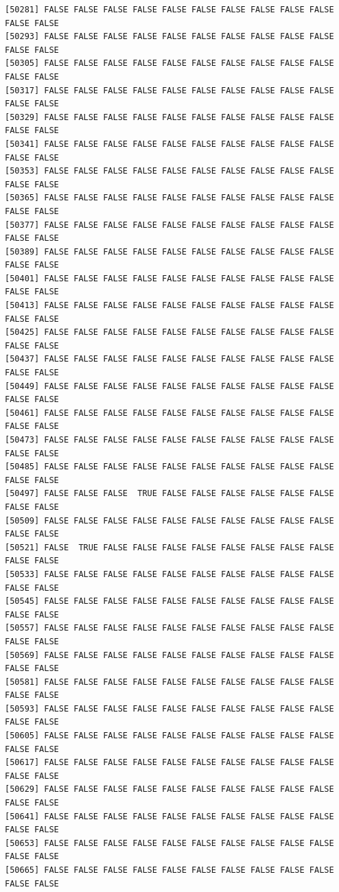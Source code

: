 \documentclass[
  a4paper,
  DIV=11,
  numbers=noendperiod]{scrartcl}
\begin{document}
\begin{verbatim}
[50281] FALSE FALSE FALSE FALSE FALSE FALSE FALSE FALSE FALSE FALSE FALSE FALSE
[50293] FALSE FALSE FALSE FALSE FALSE FALSE FALSE FALSE FALSE FALSE FALSE FALSE
[50305] FALSE FALSE FALSE FALSE FALSE FALSE FALSE FALSE FALSE FALSE FALSE FALSE
[50317] FALSE FALSE FALSE FALSE FALSE FALSE FALSE FALSE FALSE FALSE FALSE FALSE
[50329] FALSE FALSE FALSE FALSE FALSE FALSE FALSE FALSE FALSE FALSE FALSE FALSE
[50341] FALSE FALSE FALSE FALSE FALSE FALSE FALSE FALSE FALSE FALSE FALSE FALSE
[50353] FALSE FALSE FALSE FALSE FALSE FALSE FALSE FALSE FALSE FALSE FALSE FALSE
[50365] FALSE FALSE FALSE FALSE FALSE FALSE FALSE FALSE FALSE FALSE FALSE FALSE
[50377] FALSE FALSE FALSE FALSE FALSE FALSE FALSE FALSE FALSE FALSE FALSE FALSE
[50389] FALSE FALSE FALSE FALSE FALSE FALSE FALSE FALSE FALSE FALSE FALSE FALSE
[50401] FALSE FALSE FALSE FALSE FALSE FALSE FALSE FALSE FALSE FALSE FALSE FALSE
[50413] FALSE FALSE FALSE FALSE FALSE FALSE FALSE FALSE FALSE FALSE FALSE FALSE
[50425] FALSE FALSE FALSE FALSE FALSE FALSE FALSE FALSE FALSE FALSE FALSE FALSE
[50437] FALSE FALSE FALSE FALSE FALSE FALSE FALSE FALSE FALSE FALSE FALSE FALSE
[50449] FALSE FALSE FALSE FALSE FALSE FALSE FALSE FALSE FALSE FALSE FALSE FALSE
[50461] FALSE FALSE FALSE FALSE FALSE FALSE FALSE FALSE FALSE FALSE FALSE FALSE
[50473] FALSE FALSE FALSE FALSE FALSE FALSE FALSE FALSE FALSE FALSE FALSE FALSE
[50485] FALSE FALSE FALSE FALSE FALSE FALSE FALSE FALSE FALSE FALSE FALSE FALSE
[50497] FALSE FALSE FALSE  TRUE FALSE FALSE FALSE FALSE FALSE FALSE FALSE FALSE
[50509] FALSE FALSE FALSE FALSE FALSE FALSE FALSE FALSE FALSE FALSE FALSE FALSE
[50521] FALSE  TRUE FALSE FALSE FALSE FALSE FALSE FALSE FALSE FALSE FALSE FALSE
[50533] FALSE FALSE FALSE FALSE FALSE FALSE FALSE FALSE FALSE FALSE FALSE FALSE
[50545] FALSE FALSE FALSE FALSE FALSE FALSE FALSE FALSE FALSE FALSE FALSE FALSE
[50557] FALSE FALSE FALSE FALSE FALSE FALSE FALSE FALSE FALSE FALSE FALSE FALSE
[50569] FALSE FALSE FALSE FALSE FALSE FALSE FALSE FALSE FALSE FALSE FALSE FALSE
[50581] FALSE FALSE FALSE FALSE FALSE FALSE FALSE FALSE FALSE FALSE FALSE FALSE
[50593] FALSE FALSE FALSE FALSE FALSE FALSE FALSE FALSE FALSE FALSE FALSE FALSE
[50605] FALSE FALSE FALSE FALSE FALSE FALSE FALSE FALSE FALSE FALSE FALSE FALSE
[50617] FALSE FALSE FALSE FALSE FALSE FALSE FALSE FALSE FALSE FALSE FALSE FALSE
[50629] FALSE FALSE FALSE FALSE FALSE FALSE FALSE FALSE FALSE FALSE FALSE FALSE
[50641] FALSE FALSE FALSE FALSE FALSE FALSE FALSE FALSE FALSE FALSE FALSE FALSE
[50653] FALSE FALSE FALSE FALSE FALSE FALSE FALSE FALSE FALSE FALSE FALSE FALSE
[50665] FALSE FALSE FALSE FALSE FALSE FALSE FALSE FALSE FALSE FALSE FALSE FALSE

\end{verbatim}
\end{document}
